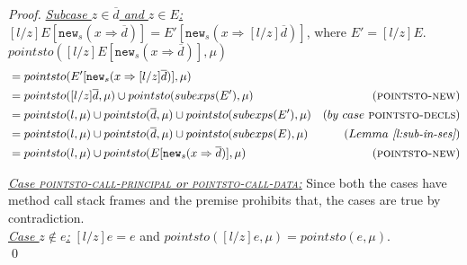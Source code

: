 \documentclass{llncs}
\newcommand{\keywadj}[1]{\mathtt{#1}}
\begin{document}
\begin{proof}
\noindent\underline{\textit{Subcase $z \in \overline{d}$ and $z \in E$:}} $[l / z]E[\keywadj{new}_s(x \Rightarrow \overline{d})] = E'[\keywadj{new}_s(x \Rightarrow [l / z]\overline{d})]$, where $E' = [l / z]E$.\\
$pointsto([l / z]E[\keywadj{new}_s(x \Rightarrow \overline{d})], \mu)$
\vspace{-7pt}
\begin{align*}
&= pointsto(E'[\keywadj{new}_s(x \Rightarrow [l / z]\overline{d})], \mu)\\
&= pointsto([l / z]\overline{d}, \mu) \cup pointsto(subexps(E'), \mu) & (\textsc{pointsto-new})\\
&= pointsto(l, \mu) \cup pointsto(\overline{d}, \mu) \cup pointsto(subexps(E'), \mu) & (by~case~\textsc{pointsto-decls})\\
&= pointsto(l, \mu) \cup pointsto(\overline{d}, \mu) \cup pointsto(subexps(E), \mu) & (Lemma~\textit{\ref{l:sub-in-ses}})\\
&= pointsto(l, \mu) \cup pointsto(E[\keywadj{new}_s(x \Rightarrow \overline{d})], \mu) & (\textsc{pointsto-new})
\end{align*}

\noindent\underline{\textit{Case \textsc{pointsto-call-principal} or \textsc{pointsto-call-data}:}} Since both the cases have method call stack frames and the premise prohibits that, the cases are true by contradiction.\\

\noindent\underline{\underline{\textit{Case $z \not\in e$:}}} $[l / z]e = e$ and $pointsto([l / z]e, \mu) = pointsto(e, \mu)$.\\
\qed
\end{proof}
\end{document}
